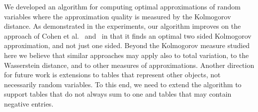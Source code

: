 \documentclass[letterpaper]{article} %
\begin{document}
We developed an algorithm for computing optimal approximations of random variables where the approximation quality is measured by the Kolmogorov distance.
As demonstrated in the experiments, our algorithm improves on the approach of Cohen et al.~\cite{cohen2015estimating} and~\cite{CohenGW18} in that it finds an optimal two sided Kolmogorov approximation, and not just one sided. Beyond the Kolmogorov measure studied here we believe that similar approaches may apply also to total variation, to the Wasserstein distance, and to other measures of approximations. Another direction for future work is extensions to tables that represent other objects, not necessarily random variables. To this end, we need to extend the algorithm to support tables that do not always sum to one and tables that may contain negative entries.



\end{document}
